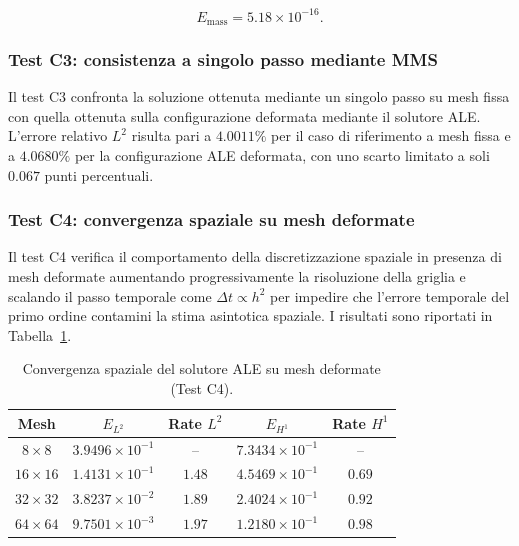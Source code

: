 \[
E_{\mathrm{mass}}
=
5.18\times10^{-16}.
\]

\subsubsection{Test C3: consistenza a singolo passo mediante MMS}

\label{subsubsec:c3}

Il test C3 confronta la soluzione ottenuta mediante un singolo passo su mesh fissa con quella ottenuta sulla configurazione deformata mediante il solutore ALE. L'errore relativo $L^2$ risulta pari a $4.0011\%$ per il caso di riferimento a mesh fissa e a $4.0680\%$ per la configurazione ALE deformata, con uno scarto limitato a soli $0.067$ punti percentuali.

\subsubsection{Test C4: convergenza spaziale su mesh deformate}

\label{subsubsec:c4}

Il test C4 verifica il comportamento della discretizzazione spaziale in presenza di mesh deformate aumentando progressivamente la risoluzione della griglia e scalando il passo temporale come $\Delta t \propto h^2$ per impedire che l'errore temporale del primo ordine contamini la stima asintotica spaziale. I risultati sono riportati in Tabella~\ref{tab:stage_c_spatial_convergence}.

\begin{table}[htbp]
\centering
\small
\setlength{\tabcolsep}{5pt}
\caption{Convergenza spaziale del solutore ALE su mesh deformate (Test C4).}
\label{tab:stage_c_spatial_convergence}
\begin{tabular}{ccccc}
\toprule
Mesh & $E_{L^2}$ & Rate $L^2$ & $E_{H^1}$ & Rate $H^1$ \\
\midrule
$8\times8$   & $3.9496\times10^{-1}$ & --     & $7.3434\times10^{-1}$ & --     \\
$16\times16$ & $1.4131\times10^{-1}$ & $1.48$ & $4.5469\times10^{-1}$ & $0.69$ \\
$32\times32$ & $3.8237\times10^{-2}$ & $1.89$ & $2.4024\times10^{-1}$ & $0.92$ \\
$64\times64$ & $9.7501\times10^{-3}$ & $1.97$ & $1.2180\times10^{-1}$ & $0.98$ \\
\bottomrule
\end{tabular}
\end{table}

